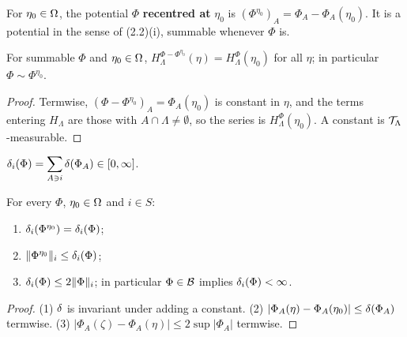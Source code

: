 \begin{definition}
    \label{def:equiv-centre}
    \leanok

    For $\eta_0 \in \Omega$, the potential $\Phi$ \textbf{recentred at} $\eta_0$ is
    $(\Phi^{\eta_0})_A = \Phi_A - \Phi_A(\eta_0)$. It is a potential in the sense of (2.2)(i),
    summable whenever $\Phi$ is.
\end{definition}

\begin{lemma}
    \label{lem:equiv-centre}
    \leanok

    For summable $\Phi$ and $\eta_0 \in \Omega$,
    $H_\Lambda^{\Phi - \Phi^{\eta_0}}(\eta) = H_\Lambda^{\Phi}(\eta_0)$ for all $\eta$; in
    particular $\Phi \sim \Phi^{\eta_0}$.
\end{lemma}
\begin{proof}
    \leanok

    Termwise, $(\Phi - \Phi^{\eta_0})_A = \Phi_A(\eta_0)$ is constant in $\eta$, and the terms
    entering $H_\Lambda$ are those with $A \cap \Lambda \neq \emptyset$, so the series is
    $H_\Lambda^{\Phi}(\eta_0)$. A constant is $\mathcal{T}_\Lambda$-measurable.
\end{proof}

\begin{definition}
    \label{def:equiv-osc-norm}
    \leanok

    $\displaystyle \delta_i(\Phi) = \sum_{A \ni i} \delta(\Phi_A) \in [0,\infty]$.
\end{definition}

\begin{lemma}
    \label{lem:equiv-osc-norm-basic}
    \leanok

    For every $\Phi$, $\eta_0 \in \Omega$ and $i \in S$:
    \begin{enumerate}
        \item $\delta_i(\Phi^{\eta_0}) = \delta_i(\Phi)$;
        \item $\|\Phi^{\eta_0}\|_i \leq \delta_i(\Phi)$;
        \item $\delta_i(\Phi) \leq 2 \|\Phi\|_i$; in particular $\Phi \in \mathcal{B}$ implies
              $\delta_i(\Phi) < \infty$.
    \end{enumerate}
\end{lemma}
\begin{proof}
    \leanok

    (1) $\delta$ is invariant under adding a constant. (2) $|\Phi_A(\eta) - \Phi_A(\eta_0)| \leq
    \delta(\Phi_A)$ termwise. (3) $|\Phi_A(\zeta) - \Phi_A(\eta)| \leq 2\sup |\Phi_A|$ termwise.
\end{proof}

